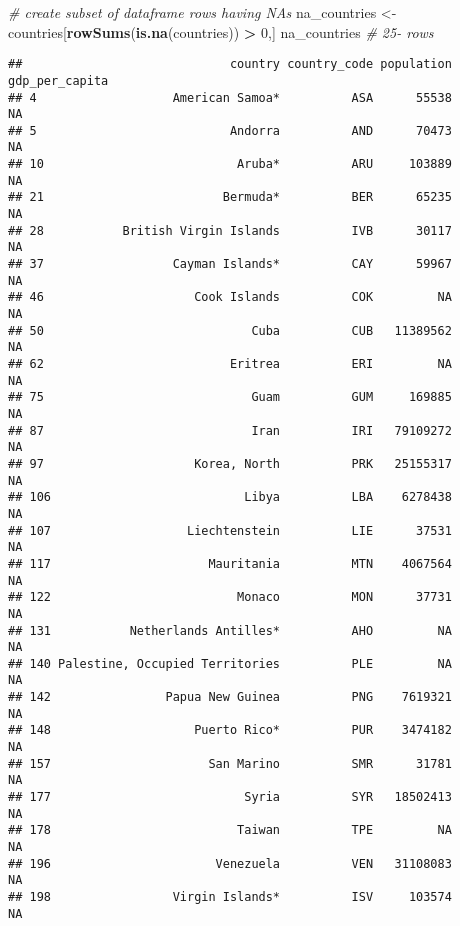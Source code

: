 \documentclass[]{article}
\newenvironment{Shaded}{\begin{snugshade}}{\end{snugshade}}
\newcommand{\CommentTok}[1]{\textcolor[rgb]{0.56,0.35,0.01}{\textit{#1}}}
\newcommand{\DecValTok}[1]{\textcolor[rgb]{0.00,0.00,0.81}{#1}}
\newcommand{\KeywordTok}[1]{\textcolor[rgb]{0.13,0.29,0.53}{\textbf{#1}}}
\newcommand{\NormalTok}[1]{#1}
\newcommand{\OperatorTok}[1]{\textcolor[rgb]{0.81,0.36,0.00}{\textbf{#1}}}
\newcommand{\StringTok}[1]{\textcolor[rgb]{0.31,0.60,0.02}{#1}}
\begin{document}
\begin{Shaded}
\begin{Highlighting}[]
    \CommentTok{#  create subset of dataframe rows having NAs}
\NormalTok{    na_countries <-}\StringTok{ }\NormalTok{countries[}\KeywordTok{rowSums}\NormalTok{(}\KeywordTok{is.na}\NormalTok{(countries)) }\OperatorTok{>}\StringTok{ }\DecValTok{0}\NormalTok{,]}
\NormalTok{    na_countries }\CommentTok{# 25- rows}
\end{Highlighting}
\end{Shaded}

\begin{verbatim}
##                             country country_code population gdp_per_capita
## 4                   American Samoa*          ASA      55538             NA
## 5                           Andorra          AND      70473             NA
## 10                           Aruba*          ARU     103889             NA
## 21                         Bermuda*          BER      65235             NA
## 28           British Virgin Islands          IVB      30117             NA
## 37                  Cayman Islands*          CAY      59967             NA
## 46                     Cook Islands          COK         NA             NA
## 50                             Cuba          CUB   11389562             NA
## 62                          Eritrea          ERI         NA             NA
## 75                             Guam          GUM     169885             NA
## 87                             Iran          IRI   79109272             NA
## 97                     Korea, North          PRK   25155317             NA
## 106                           Libya          LBA    6278438             NA
## 107                   Liechtenstein          LIE      37531             NA
## 117                      Mauritania          MTN    4067564             NA
## 122                          Monaco          MON      37731             NA
## 131           Netherlands Antilles*          AHO         NA             NA
## 140 Palestine, Occupied Territories          PLE         NA             NA
## 142                Papua New Guinea          PNG    7619321             NA
## 148                    Puerto Rico*          PUR    3474182             NA
## 157                      San Marino          SMR      31781             NA
## 177                           Syria          SYR   18502413             NA
## 178                          Taiwan          TPE         NA             NA
## 196                       Venezuela          VEN   31108083             NA
## 198                 Virgin Islands*          ISV     103574             NA
\end{verbatim}
\end{document}
